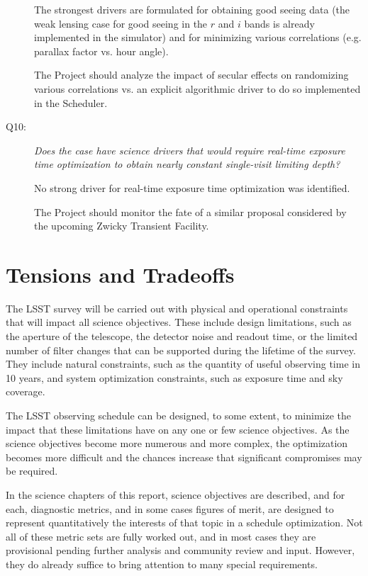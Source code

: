 \begin{description}
The strongest drivers are formulated for obtaining good seeing data (the
weak lensing case for good seeing in the $r$ and $i$ bands is already
implemented in the simulator) and for minimizing various correlations
(e.g. parallax factor vs. hour angle).

The Project should analyze the impact of secular effects on randomizing
various correlations vs. an explicit algorithmic driver to do so
implemented in the Scheduler.


\item[Q10:] {\it Does the case have science drivers that would require
real-time exposure time optimization to obtain nearly constant
single-visit limiting depth?}

No strong driver for real-time exposure time optimization was
identified.

The Project should monitor the fate of a similar proposal considered by
the upcoming Zwicky Transient Facility.

\end{description}



\section{Tensions and Tradeoffs}


The LSST survey will be carried out with physical and operational
constraints that will impact all science objectives.  These include
design limitations, such as the aperture of the telescope, the detector
noise and readout time, or the limited number of filter changes that
can be supported during the lifetime of the survey.  They include
natural constraints, such as the quantity of useful observing time
in 10 years, and system optimization constraints, such as
exposure time and sky coverage.

The LSST observing schedule can be designed, to some extent, to minimize
the impact that these limitations have on any one or few science
objectives. As the science objectives become more numerous and more
complex, the optimization becomes more difficult and the chances
increase that significant compromises may be required.

In the science chapters of this report, science objectives are
described, and for each, diagnostic metrics, and in some cases figures
of merit, are designed to represent quantitatively the interests of that
topic in a schedule optimization.  Not all of these metric sets are
fully worked out, and in most cases they are provisional pending further
analysis and community review and input.  However, they do already
suffice to bring attention to many special requirements.

